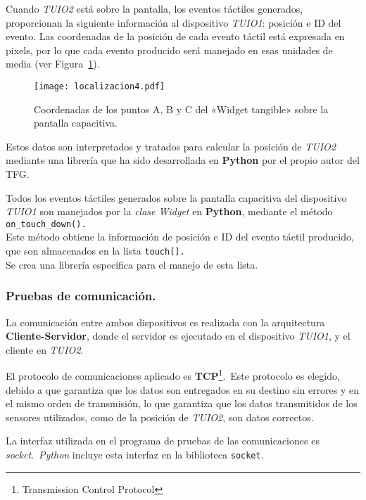 Cuando \emph{TUIO2} está sobre la pantalla, los eventos táctiles generados, proporcionan la siguiente información al dispositivo \emph{TUIO1}: posición e ID del evento. Las coordenadas de la posición de cada evento táctil está expresada en pixels, por lo que cada evento producido será manejado en esas unidades de media (ver Figura~\ref{fig:Localizacion4}).\\
\begin{figure}[!h]
\begin{center}
\texttt{[image: localizacion4.pdf]}
\caption{Coordenadas de los puntos A, B y C del «Widget tangible» sobre la pantalla capacitiva. }
\label{fig:Localizacion4}
\end{center}
\end{figure}
Estos datos son interpretados y tratados para calcular la posición de \emph{TUIO2} mediante una librería que ha sido desarrollada en \textbf{Python} por el propio autor del TFG.

Todos los eventos táctiles generados sobre la pantalla capacitiva del dispositivo \emph{TUIO1} son manejados por la \textit{clase Widget} en \textbf{Python}, mediante el método \texttt{on\_touch\_down().}\\
Este método obtiene la información de posición e ID del evento táctil producido, que son almacenados en la lista \texttt{touch[].}\\
Se crea una librería específica para el manejo de esta lista.


\subsubsection{Pruebas de comunicación.}

La comunicación entre ambos dispositivos es realizada con la arquitectura \textbf{Cliente-Servidor}, donde el servidor es ejecutado en el dispositivo \emph{TUIO1}, y el cliente en \emph{TUIO2}.\

El protocolo de comunicaciones aplicado es \textbf{TCP}\footnote{Transmission Control Protocol}.\
Este protocolo es elegido, debido a que garantiza que los datos son entregados en su destino sin errores y en el mismo orden de transmisión, lo que garantiza que los datos transmitidos de los sensores utilizados, como de la posición de \emph{TUIO2}, son datos correctos.\

La interfaz utilizada en el programa de pruebas de las comunicaciones es \emph{socket}.\ 
\emph{Python} incluye esta interfaz en la biblioteca \texttt{socket}.

